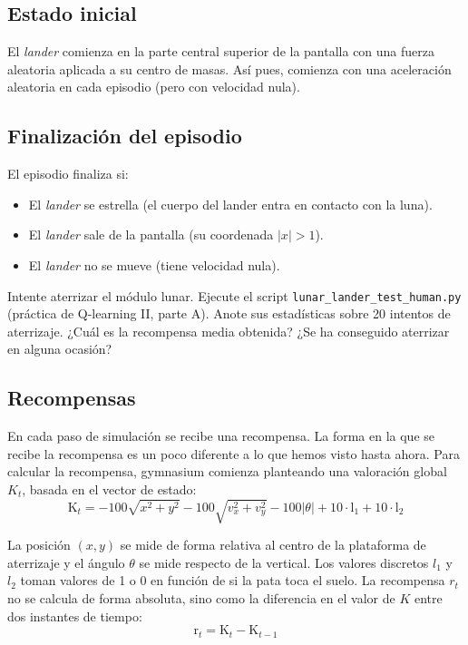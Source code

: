 \documentclass{article}
\begin{document}
 
\subsection{Estado inicial}
El \textit{lander} comienza en la parte central superior de la pantalla con una fuerza aleatoria aplicada a su centro de masas. Así pues, comienza con una aceleración aleatoria en cada episodio (pero con velocidad nula).

\subsection{Finalización del episodio}
El episodio finaliza si:
\begin{itemize}
    \item El \textit{lander} se estrella (el cuerpo del lander entra en contacto con la luna).
    \item El \textit{lander} sale de la pantalla (su coordenada $|x|>1$).
    \item El \textit{lander} no se mueve (tiene velocidad nula).
\end{itemize}


\begin{exercise}
    Intente aterrizar el módulo lunar. Ejecute el script \texttt{lunar\_lander\_test\_human.py} (práctica de  Q-learning II, parte A). Anote sus estadísticas sobre 20 intentos de aterrizaje. ¿Cuál es la recompensa media obtenida? ¿Se ha conseguido aterrizar en alguna ocasión?
\end{exercise}

\subsection{Recompensas}
En cada paso de simulación se recibe una recompensa. La forma en la que se recibe la recompensa es un poco diferente a lo que hemos visto hasta ahora. Para calcular la recompensa, gymnasium comienza planteando una valoración global $K_t$, basada en el vector de estado:
$$\text{K}_t = -100 \sqrt{x^2 + y^2} - 100 \sqrt{v_x^2 + v_y^2} - 100 \vert{}\theta\vert{} + 10 \cdot \text{l}_1 + 10 \cdot \text{l}_2$$

La posición $(x, y)$ se mide de forma relativa al centro de la plataforma de aterrizaje y el ángulo $\theta$ se mide respecto de la vertical. Los valores discretos $l_1$ y $l_2$ toman valores de 1 o 0 en función de si la pata toca el suelo.  La recompensa $r_t$ no se calcula de forma absoluta, sino como la diferencia en el valor de $K$ entre dos instantes de tiempo:
\begin{equation*}
\text{r}_t = \text{K}_t - \text{K}_{t-1} 
\end{equation*}
\end{document}
